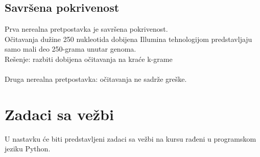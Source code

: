 \subsection{Savršena pokrivenost}

Prva nerealna pretpostavka je savršena pokrivenost.
\\
Očitavanja dužine 250 nukleotida dobijena Illumina tehnologijom predstavljaju samo mali deo 250-grama unutar genoma.
\\
Rešenje: razbiti dobijena očitavanja na kraće k-grame
\\
\\
Druga nerealna pretpostavka: očitavanja ne sadrže greške.

\newpage
\section{Zadaci sa vežbi}
U nastavku će biti predstavljeni zadaci sa vežbi na kursu rađeni u programskom jeziku Python.


